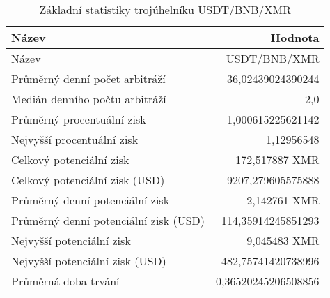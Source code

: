 \begin{table}\centering
\caption{Základní statistiky trojúhelníku USDT/BNB/XMR}
\label{USDTBNBXMR_stats}
\begin{tabular}{|| l | r ||}
\hline Název & Hodnota \\ 
\hline\hline Název & USDT/BNB/XMR \\ 
\hline Průměrný denní počet arbitráží & 36,02439024390244 \\ 
\hline Medián denního počtu arbitráží & 2,0 \\ 
\hline Průměrný procentuální zisk & 1,000615225621142 \\ 
\hline Nejvyšší procentuální zisk & 1,12956548 \\ 
\hline Celkový potenciální zisk & 172,517887 XMR \\ 
\hline Celkový potenciální zisk (USD) & 9207,279605575888 \\ 
\hline Průměrný denní potenciální zisk & 2,142761 XMR \\ 
\hline Průměrný denní potenciální zisk (USD) & 114,35914245851293 \\ 
\hline Nejvyšší potenciální zisk & 9,045483 XMR \\ 
\hline Nejvyšší potenciální zisk (USD) & 482,75741420738996 \\ 
\hline Průměrná doba trvání & 0,36520245206508856 \\ 
\hline
\end{tabular}
\end{table}